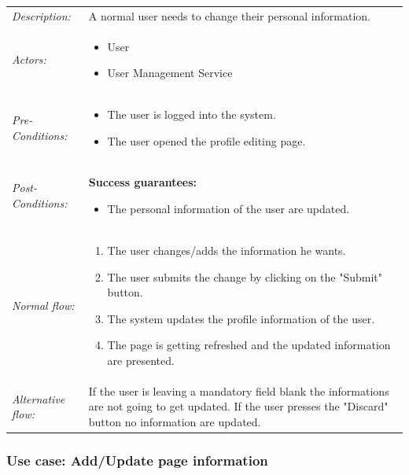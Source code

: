 \documentclass[11pt,a4paper]{report}
\begin{document}
\begin{longtable}{p{} | p{}}
        \hline
        \emph{Description:} & A normal user needs to change their personal information.\\
        \emph{Actors:} & 
            \begin{itemize} 
                \item User
                \item User Management Service
             \end{itemize} \\
        \emph{Pre-Conditions:} & 
            \begin{itemize} 
                \item The user is logged into the system.
                \item The user opened the profile editing page.
             \end{itemize} \\
        \emph{Post-Conditions:} & \textbf{Success guarantees:} 
            \begin{itemize} 
                \item The personal information of the user are updated. 
            \end{itemize} \\
        \emph{Normal flow:} & 
            \begin{enumerate} 
                \item The user changes/adds the information he wants.
                \item The user submits the change by clicking on the "Submit" button.
                \item The system updates the profile information of the user.
                \item The page is getting refreshed and the updated information are presented.
             \end{enumerate} \\
        \emph{Alternative flow:} & If the user is leaving a mandatory field blank the informations are not going to get updated. If the user presses the "Discard" button no information are updated.\\ 
             \hline
\end{longtable}

\subsubsection{Use case: Add/Update page information}
\end{document}
